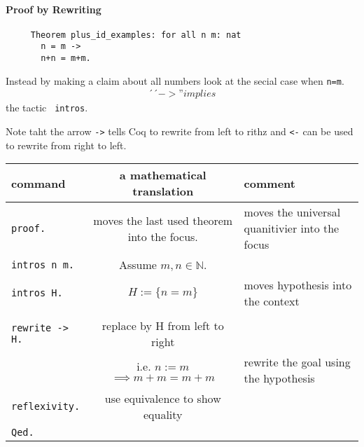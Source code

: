      \paragraph{Proof by Rewriting}
     \begin{example}
	 \begin{lstlisting}
	 Theorem plus_id_examples: for all n m: nat
       n = m -> 
	   n+n = m+m.	 
	 \end{lstlisting}     
     Instead by making a claim about all numbers look at the secial case when \lstinline!n=m!.
     \begin{align*}
     \texttt{´´} -> \texttt{''} implies 
     \end{align*}
     the tactic \lstinline! intros!.     
     \end{example}
    
     Note taht the arrow \lstinline!->! tells Coq to rewrite from left to rithz and \lstinline!<-! can be used to rewrite from right to left.
     
     \begin{tabular} {|l|c|l|}
     	\hline
     	command                         & a mathematical translation                       & comment \\  \hline
     	\lstinline!proof.!              & moves the last used theorem into the focus.      & moves the universal quanitivier into the focus  \\ \hline
     	\lstinline!intros n m.!         & Assume $m,n \in \mathbb{N}.$                     &                                                 \\ \hline
    	\lstinline!intros H.!           & $H :=\{n=m\}$                                    & moves hypothesis into the context                \\    \hline                                            \\
     	\lstinline!rewrite -> H.!       & replace by H from left to right                  &                                                 \\  
     	                                & i.e. $n:=m$ $\implies m+m = m+m$                 & rewrite the goal using the hypothesis           \\ \hline
     	\lstinline!reflexivity.!        & use equivalence to show equality                 &                                                 \\ \hline
    	\lstinline!Qed.!                &                                                  &                                                 \\  \hline
    	\hline
     \end{tabular}
   
